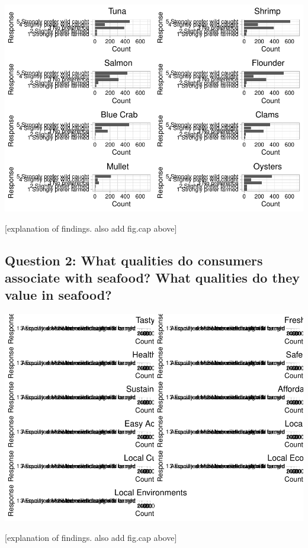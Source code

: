 \documentclass[
  12pt,
]{article}
\begin{document}
\includegraphics{Final_rmd_files/figure-latex/preference-1.pdf}

{[}explanation of findings. also add fig.cap above{]}

\hypertarget{question-2-what-qualities-do-consumers-associate-with-seafood-what-qualities-do-they-value-in-seafood}{%
\subsection{Question 2: What qualities do consumers associate with
seafood? What qualities do they value in
seafood?}\label{question-2-what-qualities-do-consumers-associate-with-seafood-what-qualities-do-they-value-in-seafood}}

\includegraphics{Final_rmd_files/figure-latex/qualities-1.pdf}

{[}explanation of findings. also add fig.cap above{]}
\end{document}
